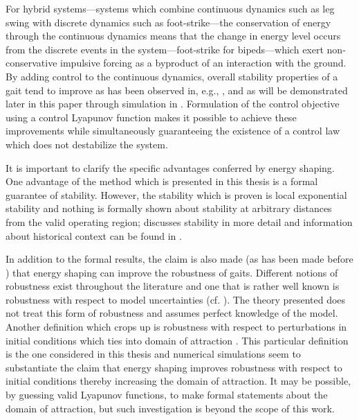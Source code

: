 For hybrid systems---systems which combine continuous dynamics such as leg
swing with discrete dynamics such as foot-strike---the conservation of energy
through the continuous dynamics means that the change in energy level occurs
from the discrete events in the system---foot-strike for bipeds---which exert
non-conservative impulsive forcing as a byproduct of an interaction with the
ground.
%
By adding control to the continuous dynamics, overall stability properties of a
gait tend to improve as has been observed in, e.g., \cite{Spong2003}, and as will
be demonstrated later in this paper through simulation in
.
%
Formulation of the control objective using a control Lyapunov function makes it
possible to achieve these improvements while simultaneously guaranteeing the
existence of a control law which does not destabilize the system.

It is important to clarify the specific advantages conferred by energy shaping.
%
One advantage of the method which is presented in this thesis is a formal
guarantee of stability.
%
However, the stability which is proven is local exponential stability and
nothing is formally shown about stability at arbitrary distances from the valid
operating region;  discusses stability in more detail
and information about historical context can be found in
.

In addition to the formal results, the claim is also made (as has been made
before \cite{Spong2003}) that energy shaping can improve the robustness of
gaits.
%
Different notions of robustness exist throughout the literature and one that is
rather well known is robustness with respect to model uncertainties
(cf. \cite{Freeman1996}).
%
The theory presented does not treat this form of robustness and assumes perfect
knowledge of the model.
%
Another definition which crops up is robustness with respect to perturbations in
initial conditions which ties into domain of attraction \cite{Chesi2011}.
%
This particular definition is the one considered in this thesis and numerical
simulations seem to substantiate the claim that energy shaping improves
robustness with respect to initial conditions thereby increasing the domain of
attraction.
%
It may be possible, by guessing valid Lyapunov functions, to make formal
statements about the domain of attraction, but such investigation is beyond the
scope of this work.
